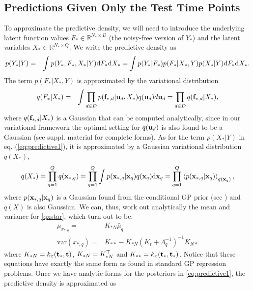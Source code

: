 \documentclass{article} %
\begin{document}
\subsection{Predictions Given Only the Test Time Points \label{unobservedData}}
To approximate the predictive density, we will need to introduce the underlying latent function values $F_* \in \mathbb{R}^{N_* \times D}$ (the noisy-free version of $Y_*$) and the latent variables $X_* \in \mathbb{R}^{N_* \times Q}$. We  write the predictive density as
\begin{eqnarray}
p(Y_* | Y) & = & \int p(Y_*, F_*, X_*| Y) \text{d}  F_* \text{d}  X_* =  \int p(Y_* | F_*)  p(F_*|X_*, Y) p(X_*|  Y) \text{d}  F_* \text{d}  X_* .
\label{eq:predictive1}
\end{eqnarray}
The term $p(F_* |X_*, Y)$ is approximated by the variational distribution
\begin{eqnarray}
q(F_*|X_*) & = & \int \prod_{d \in D} p(\mathbf{f}_{*,d} | \mathbf{u}_d, X_*)  q(\mathbf{u}_d) d \mathbf{u}_d 
	    = \prod_{d \in D} q(\mathbf{f}_{*,d} | X_*)  ,
\end{eqnarray}
where $q(\mathbf{f}_{*,d} | X_*)$ is a Gaussian that can be computed analytically,
since in our variational framework the optimal setting for $q(\mathbf{u}_d)$ is also found to be a Gaussian (see suppl. material for complete forms).
%
As for the term $p(X_*| Y)$ in eq. (\ref{eq:predictive1}), it is approximated by
a Gaussian variational distribution $q(X_*)$,
%
\begin{align}
 q(X_*) = \prod_{q=1}^Q q(\mathbf{x}_{*,q}) = 
\prod_{q=1}^Q   \int  p(\mathbf{x}_{*,q} | \mathbf{x}_q) q(\mathbf{x}_q) \text{d} \mathbf{x}_q = \prod_{q=1}^Q \left\langle  p(\mathbf{x}_{*,q} | \mathbf{x}_q) \right\rangle_{q(\mathbf{x}_q)} ,\label{qxstar}
\end{align}
%
where $p(\mathbf{x}_{*,q} | \mathbf{x}_q)$ is a Gaussian found from the conditional GP prior
(see \cite{rasmussen-williams}) and $q(X)$ is also Gaussian. We can, thus, work out analytically the mean and variance 
for \eqref{qxstar}, which turn out to be:
\begin{align}
 \mu_{x_{*,q}} = {}& K_{*N} \bar{\mu}_q \\
  \text{var}(x_{*,q}) = {}& K_{**} - K_{*N} (K_t + \Lambda_q^{-1})^{-1} K_{N*}
\end{align}
where $K_{*N} = k_x(\mathbf{t}_*, \mathbf{t})$, $K_{*N} = K_{*N}^{\top}$ and $K_{**} = k_x(\mathbf{t}_*, \mathbf{t}_*)$. Notice that these equations have
exactly the same form as found in standard GP regression problems.
%
Once we have analytic forms for the posteriors in \eqref{eq:predictive1}, the predictive density is approximated as
\end{document}
